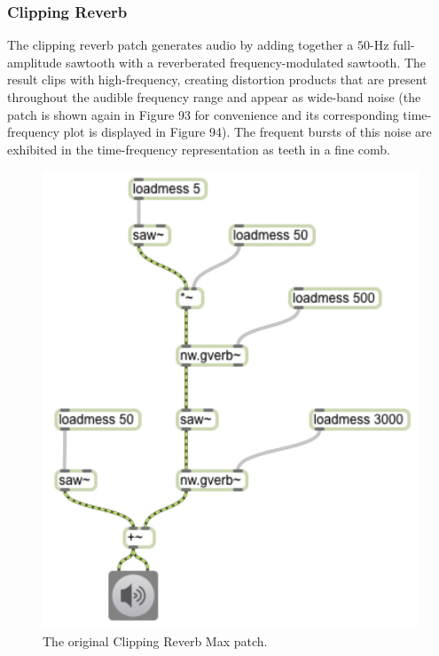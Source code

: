 \documentclass[12pt]{report} 	%
\numberwithin{figure}{chapter}
\numberwithin{table}{chapter}
\numberwithin{equation}{chapter}
\begin{document}
\begin{flushleft}
\clearpage
\subsubsection{Clipping Reverb}
The clipping reverb patch generates audio by adding together a $50$-Hz full-amplitude sawtooth with a reverberated frequency-modulated sawtooth. The result clips with high-frequency, creating distortion products that are present throughout the audible frequency range and appear as wide-band noise (the patch is shown again in Figure 93 for convenience and its corresponding time-frequency plot is displayed in Figure 94). The frequent bursts of this noise are exhibited in the time-frequency representation as teeth in a fine comb.
\begin{figure}[h!]
\begin{center}
\includegraphics[scale=0.8]{ClippingReverbSaw}
\caption[Original clipping reverb Max patch]{The original Clipping Reverb Max patch.}
\end{center}
\end{figure}


\end{flushleft}
\end{document}
